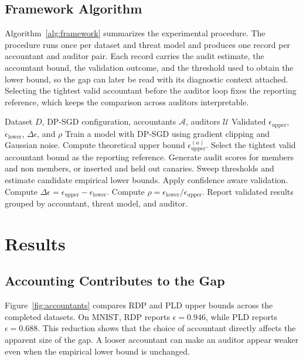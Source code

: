 \documentclass{article}
\begin{document}
\subsection{Framework Algorithm}
Algorithm~\ref{alg:framework} summarizes the experimental procedure. The procedure runs once per dataset and threat model and produces one record per accountant and auditor pair. Each record carries the audit estimate, the accountant bound, the validation outcome, and the threshold used to obtain the lower bound, so the gap can later be read with its diagnostic context attached. Selecting the tightest valid accountant before the auditor loop fixes the reporting reference, which keeps the comparison across auditors interpretable.

\begin{algorithm}[h]
\caption{DP-SGD Gap Decomposition Audit Framework}
\label{alg:framework}
\begin{algorithmic}[1]
\Require Dataset $D$, DP-SGD configuration, accountants $\mathcal{A}$, auditors $\mathcal{U}$
\Ensure Validated $\epsilon_{\mathrm{upper}}$, $\epsilon_{\mathrm{lower}}$, $\Delta\epsilon$, and $\rho$
\State Train a model with DP-SGD using gradient clipping and Gaussian noise.
    \State Compute theoretical upper bound $\epsilon_{\mathrm{upper}}^{(a)}$.
\EndFor
\State Select the tightest valid accountant bound as the reporting reference.
    \State Generate audit scores for members and non members, or inserted and held out canaries.
    \State Sweep thresholds and estimate candidate empirical lower bounds.
    \State Apply confidence aware validation.
    \State Compute $\Delta\epsilon = \epsilon_{\mathrm{upper}} - \epsilon_{\mathrm{lower}}$.
    \State Compute $\rho = \epsilon_{\mathrm{lower}} / \epsilon_{\mathrm{upper}}$.
\EndFor
\State Report validated results grouped by accountant, threat model, and auditor.
\end{algorithmic}
\end{algorithm}

\section{Results}
\subsection{Accounting Contributes to the Gap}
Figure~\ref{fig:accountants} compares RDP and PLD upper bounds across the completed datasets. On MNIST, RDP reports $\epsilon = 0.946$, while PLD reports $\epsilon = 0.688$. This reduction shows that the choice of accountant directly affects the apparent size of the gap. A looser accountant can make an auditor appear weaker even when the empirical lower bound is unchanged.
\end{document}
